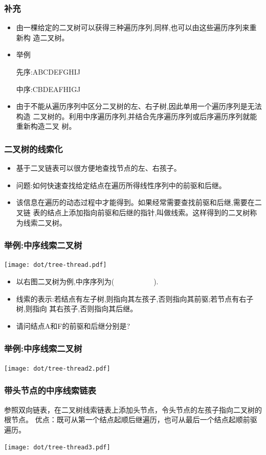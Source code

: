 \begin{frame}[fragile]
  \frametitle{补充}
  \begin{itemize}
  \item 由一棵给定的二叉树可以获得三种遍历序列,同样,也可以由这些遍历序列来重新构
    造二叉树。
  \item 举例
    
    先序:ABCDEFGHIJ
    
    中序:CBDEAFHIGJ
  \item 由于不能从遍历序列中区分二叉树的左、右子树,因此单用一个遍历序列是无法构造
    二叉树的。利用中序遍历序列,并结合先序遍历序列或后序遍历序列就能重新构造二叉
    树。
  \end{itemize}
\end{frame}

\begin{frame}[fragile]
  \frametitle{二叉树的线索化}
  \begin{itemize}
  \item 基于二叉链表可以很方便地查找节点的左、右孩子。
  \item 问题:如何快速查找给定结点在遍历所得线性序列中的前驱和后继。
  \item 该信息在遍历的动态过程中才能得到。如果经常需要查找前驱和后继,需要在二叉链
    表的结点上添加指向前驱和后继的指针,叫做{\color{red}线索}。这样得到的二叉树称
    为{\color{red}线索二叉树}。
  \end{itemize}
\end{frame}

\begin{frame}[fragile]
  \frametitle{举例:中序线索二叉树}
  \texttt{[image: dot/tree-thread.pdf]}
  \begin{itemize}
  \item 以右图二叉树为例,中序序列为(~~~~~~~~~~~).
  \item 线索的表示:若结点有左子树,则指向其左孩子,否则指向其前驱;若节点有右子树,则指向
    其右孩子,否则指向其后继。
  \item 请问结点A和F的前驱和后继分别是?
  \end{itemize}
\end{frame}

\begin{frame}[fragile]
  \frametitle{举例:中序线索二叉树}
  \texttt{[image: dot/tree-thread2.pdf]}
\end{frame}

\begin{frame}[fragile]
  \frametitle{带头节点的中序线索链表}
  参照双向链表，在二叉树线索链表上添加头节点，令头节点的左孩子指向二叉树的根节点。
  优点：既可从第一个结点起顺后继遍历，也可从最后一个结点起顺前驱遍历。
  
  \texttt{[image: dot/tree-thread3.pdf]}
\end{frame}

